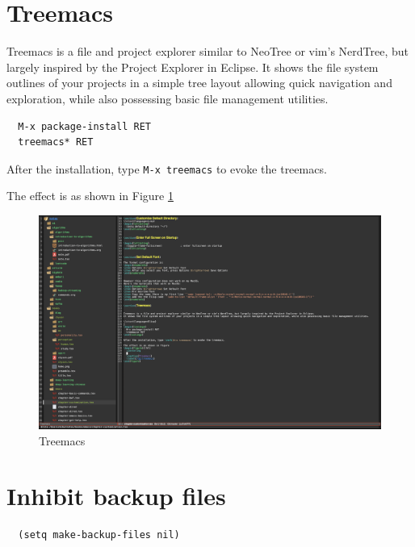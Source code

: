 \section{Treemacs}


Treemacs is a file and project explorer similar to NeoTree or vim’s NerdTree, but largely inspired by the Project Explorer in Eclipse.
It shows the file system outlines of your projects in a simple tree layout allowing quick navigation and exploration, while also possessing basic file management utilities.

\lstset{language=Elisp}
\begin{lstlisting}
  M-x package-install RET
  treemacs* RET
\end{lstlisting}

After the installation, type \verb|M-x treemacs| to evoke the treemacs.

The effect is as shown in Figure \ref{fig:treemacs}
\begin{figure}[!ht]
  \centering
  \includegraphics[width=\textwidth]{treemacs}
  \caption{Treemacs}
  \label{fig:treemacs}
\end{figure}


\section{Inhibit backup files}

\lstset{language=Elisp}
\begin{lstlisting}
  (setq make-backup-files nil)
\end{lstlisting}